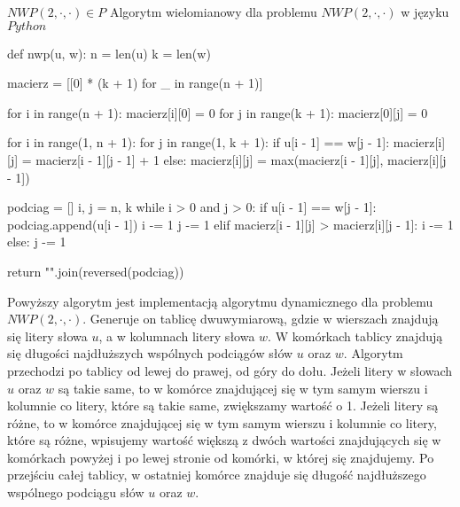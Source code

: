 \documentclass{article}
\begin{document}
\newpage
\begin{section}
 {$NWP(2, \cdot, \cdot) \in P$}
 Algorytm wielomianowy dla problemu $NWP(2, \cdot, \cdot)$ w języku $Python$ \cite{cormen}
 \begin{python}
def nwp(u, w):
    n = len(u)
    k = len(w)

    macierz = [[0] * (k + 1) for _ in range(n + 1)]

    for i in range(n + 1):
        macierz[i][0] = 0
    for j in range(k + 1):
        macierz[0][j] = 0

    for i in range(1, n + 1):
        for j in range(1, k + 1):
            if u[i - 1] == w[j - 1]:
                macierz[i][j] = macierz[i - 1][j - 1] + 1  
            else:
                macierz[i][j] = max(macierz[i - 1][j], macierz[i][j - 1])

    podciag = []
    i, j = n, k
    while i > 0 and j > 0:
        if u[i - 1] == w[j - 1]:
            podciag.append(u[i - 1])
            i -= 1
            j -= 1
        elif macierz[i - 1][j] > macierz[i][j - 1]:
            i -= 1
        else:
            j -= 1
            
    return "".join(reversed(podciag))
 \end{python}

 Powyższy algorytm jest implementacją algorytmu dynamicznego dla problemu \newline $NWP(2, \cdot, \cdot)$. 
Generuje on tablicę dwuwymiarową, gdzie w wierszach znajdują się litery słowa $u$, a w kolumnach litery słowa $w$.
W komórkach tablicy znajdują się długości najdłuższych wspólnych podciągów słów $u$ oraz $w$. 
Algorytm przechodzi po tablicy od lewej do prawej, od góry do dołu.
Jeżeli litery w słowach $u$ oraz $w$ są takie same, to w komórce znajdującej się w tym samym wierszu i kolumnie co litery,
które są takie same, zwiększamy wartość o 1. Jeżeli litery są różne, to w komórce znajdującej się w tym samym wierszu i kolumnie co litery,
które są różne, wpisujemy wartość większą z dwóch wartości znajdujących się w komórkach powyżej i po lewej stronie od komórki, w której się znajdujemy.
Po przejściu całej tablicy, w ostatniej komórce znajduje się długość najdłuższego wspólnego podciągu słów $u$ oraz $w$.
\end{section}
\newpage
\end{document}

